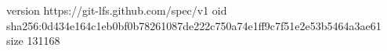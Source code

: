 version https://git-lfs.github.com/spec/v1
oid sha256:0d434e164c1eb0bf0b78261087de222c750a74e1ff9c7f51e2e53b5464a3ae61
size 131168
